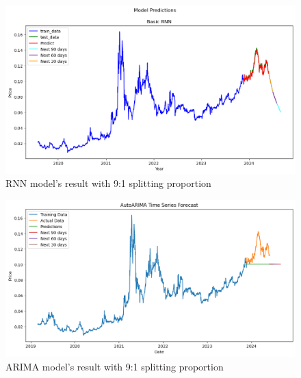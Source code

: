 \documentclass{ieeeojies}
\begin{document}
\begin{figure}[H]
  \centering
  \begin{minipage}{0.8\linewidth}
    \centering
    \includegraphics[width=\linewidth]{Image/RNN/RNN_TRON91.png}
    \caption{RNN model's result with 9:1 splitting proportion}
    \label{fig:11}
  \end{minipage}
\end{figure}
\vspace{-5mm}
\begin{figure}[H]
  \centering
  \begin{minipage}{0.8\linewidth}
    \centering
    \includegraphics[width=\linewidth]{Image/Arima/Arima_tron_9_1_n.png}
    \caption{ARIMA model's result with 9:1 splitting proportion}
    \label{fig:12}
  \end{minipage}
\end{figure}
\vspace{-5mm}
\end{document}
